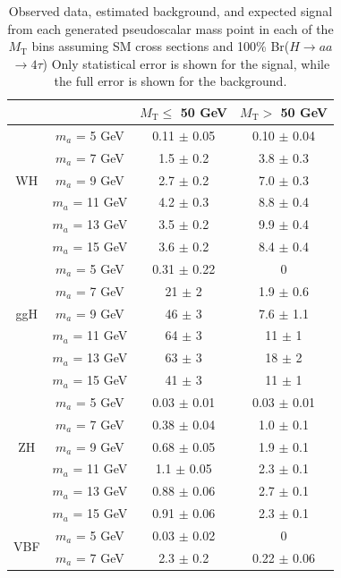 \begin{table}[htbh]
\begin{center}
\caption{Observed data, estimated background, and expected signal from each generated pseudoscalar mass point in each of the $M_{\text{T}}$ bins assuming SM cross sections and 100\% Br($H\rightarrow$$aa$$\rightarrow4\tau$)  Only statistical error is shown for the signal, while the full error is shown for the background.\label{tab:results}}
\singlespacing
\begin{tabular}{|c|c|c|c|}
\hline
\multicolumn{2}{|c|}{} & $M_{\text{T}} \le$ 50 GeV & $M_{\text{T}} >$ 50 GeV \\
\hline
\multirow{5}{*}{WH} & $m_{a}$ = 5 GeV & 0.11 $\pm$ 0.05 & 0.10 $\pm$ 0.04 \\
& $m_{a}$ = 7 GeV & 1.5 $\pm$ 0.2 & 3.8 $\pm$ 0.3 \\
& $m_{a}$ = 9 GeV & 2.7 $\pm$ 0.2 & 7.0 $\pm$ 0.3 \\
& $m_{a}$ = 11 GeV & 4.2 $\pm$ 0.3 & 8.8 $\pm$ 0.4 \\
& $m_{a}$ = 13 GeV & 3.5 $\pm$ 0.2 & 9.9 $\pm$ 0.4 \\
& $m_{a}$ = 15 GeV & 3.6 $\pm$ 0.2 & 8.4 $\pm$ 0.4 \\
\hline
\multirow{5}{*}{ggH} & $m_{a}$ = 5 GeV & 0.31 $\pm$ 0.22 & 0 \\
& $m_{a}$ = 7 GeV & 21 $\pm$ 2 & 1.9 $\pm$ 0.6 \\
& $m_{a}$ = 9 GeV & 46 $\pm$ 3 & 7.6 $\pm$ 1.1 \\
& $m_{a}$ = 11 GeV & 64 $\pm$ 3 & 11 $\pm$ 1 \\
& $m_{a}$ = 13 GeV & 63 $\pm$ 3 & 18 $\pm$ 2 \\
& $m_{a}$ = 15 GeV & 41 $\pm$ 3 & 11 $\pm$ 1 \\
\hline
\multirow{5}{*}{ZH} & $m_{a}$ = 5 GeV & 0.03 $\pm$ 0.01 & 0.03 $\pm$ 0.01 \\
& $m_{a}$ = 7 GeV & 0.38 $\pm$ 0.04 & 1.0 $\pm$ 0.1 \\
& $m_{a}$ = 9 GeV & 0.68 $\pm$ 0.05 & 1.9 $\pm$ 0.1 \\
& $m_{a}$ = 11 GeV & 1.1 $\pm$ 0.05 & 2.3 $\pm$ 0.1 \\
& $m_{a}$ = 13 GeV & 0.88 $\pm$ 0.06 & 2.7 $\pm$ 0.1 \\
& $m_{a}$ = 15 GeV & 0.91 $\pm$ 0.06 & 2.3 $\pm$ 0.1 \\
\hline
\multirow{5}{*}{VBF} & $m_{a}$ = 5 GeV & 0.03 $\pm$ 0.02 & 0 \\
& $m_{a}$ = 7 GeV & 2.3 $\pm$ 0.2 & 0.22 $\pm$ 0.06 \\

\end{tabular}
\end{center}
\end{table}
